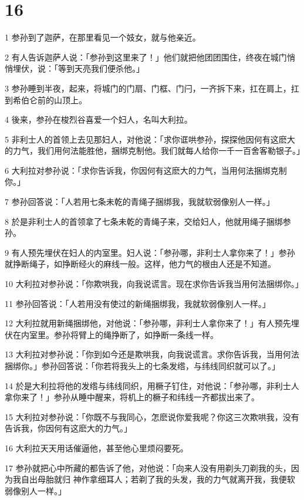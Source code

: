 \chapter{16}

\par 1 参孙到了迦萨，在那里看见一个妓女，就与他亲近。
\par 2 有人告诉迦萨人说：「参孙到这里来了！」他们就把他团团围住，终夜在城门悄悄埋伏，说：「等到天亮我们便杀他。」
\par 3 参孙睡到半夜，起来，将城门的门扇、门框、门闩，一齐拆下来，扛在肩上，扛到希伯仑前的山顶上。
\par 4 後来，参孙在梭烈谷喜爱一个妇人，名叫大利拉。
\par 5 非利士人的首领上去见那妇人，对他说：「求你诓哄参孙，探探他因何有这麽大的力气，我们用何法能胜他，捆绑克制他。我们就每人给你一千一百舍客勒银子。」
\par 6 大利拉对参孙说：「求你告诉我，你因何有这麽大的力气，当用何法捆绑克制你。」
\par 7 参孙回答说：「人若用七条未乾的青绳子捆绑我，我就软弱像别人一样。」
\par 8 於是非利士人的首领拿了七条未乾的青绳子来，交给妇人，他就用绳子捆绑参孙。
\par 9 有人预先埋伏在妇人的内室里。妇人说：「参孙哪，非利士人拿你来了！」参孙就挣断绳子，如挣断经火的麻线一般。这样，他力气的根由人还是不知道。
\par 10 大利拉对参孙说：「你欺哄我，向我说谎言。现在求你告诉我当用何法捆绑你。」
\par 11 参孙回答说：「人若用没有使过的新绳捆绑我，我就软弱像别人一样。」
\par 12 大利拉就用新绳捆绑他，对他说：「参孙哪，非利士人拿你来了！」有人预先埋伏在内室里。参孙将臂上的绳挣断了，如挣断一条线一样。
\par 13 大利拉对参孙说：「你到如今还是欺哄我，向我说谎言。求你告诉我，当用何法捆绑你。」参孙回答说：「你若将我头上的七条发绺，与纬线同织就可以了。」
\par 14 於是大利拉将他的发绺与纬线同织，用橛子钉住，对他说：「参孙哪，非利士人拿你来了！」参孙从睡中醒来，将机上的橛子和纬线一齐都拔出来了。
\par 15 大利拉对参孙说：「你既不与我同心，怎麽说你爱我呢？你这三次欺哄我，没有告诉我，你因何有这麽大的力气。」
\par 16 大利拉天天用话催逼他，甚至他心里烦闷要死。
\par 17 参孙就把心中所藏的都告诉了他，对他说：「向来人没有用剃头刀剃我的头，因为我自出母胎就归 神作拿细耳人；若剃了我的头发，我的力气就离开我，我便软弱像别人一样。」
